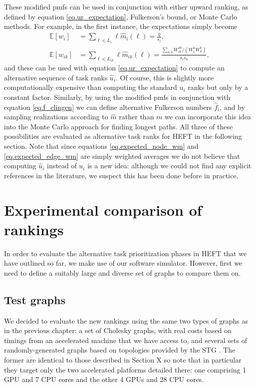 \documentclass[12pt]{article}
\def\E{\mathbb{E}}
\begin{document}
These modified pmfs can be used in conjunction with either upward ranking, as defined by equation \eqref{eq.ur_expectation}, Fulkerson's bound, or Monte Carlo methods. For example, in the first instance, the expectations simply become 
\begin{align}
\E[w_i] &= \sum_{\ell \in L_i} \ell \hat{m}_i(\ell) = \frac{q}{s_i}, \label{eq.expected_node_wm}\\
\E[w_{ik}] &= \sum_{\ell \in L_{ik}} \ell \hat{m}_{ik}(\ell) = \frac{\sum_{a, b} W_{ik}^{ab} / (W_i^a W_k^b)}{s_i s_k} \label{eq.expected_edge_wm},
\end{align}
and these can be used with equation \eqref{eq.ur_expectation} to compute an alternative sequence of task ranks $\hat{u}_i$. Of course, this is slightly more computationally expensive than computing the standard $u_i$ ranks but only by a constant factor. Similarly, by using the modified pmfs in conjunction with equation \eqref{eq.f_clingen} we can define alternative Fulkerson numbers $\hat{f}_i$, and by sampling realizations according to $\hat{m}$ rather than $m$ we can incorporate this idea into the Monte Carlo approach for finding longest paths. All three of these possibilities are evaluated as alternative task ranks for HEFT in the following section. Note that since equations \eqref{eq.expected_node_wm} and \eqref{eq.expected_edge_wm} are simply weighted averages we do not believe that computing $\hat{u}_i$ instead of $u_i$ is a new idea: although we could not find any explicit references in the literature, we suspect this has been done before in practice.  


\section{Experimental comparison of rankings}
\label{sect.experimental_rankings}

In order to evaluate the alternative task prioritization phases in HEFT that we have outlined so far, we make use of our software simulator. However, first we need to define a suitably large and diverse set of graphs to compare them on. 

\subsection{Test graphs}
\label{subsect.graphs}

We decided to evaluate the new rankings using the same two types of graphs as in the previous chapter: a set of Cholesky graphs, with real costs based on timings from an accelerated machine that we have access to, and several sets of randomly-generated graphs based on topologies provided by the STG \cite{tob02}. The former are identical to those described in Section X so note that in particular they target only the two accelerated platforms detailed there: one comprising 1 GPU and 7 CPU cores and the other 4 GPUs and 28 CPU cores.
\end{document}
